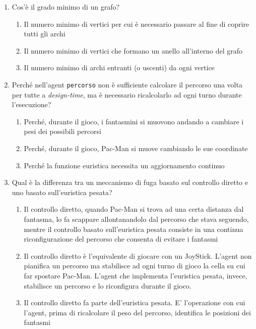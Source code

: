 \documentclass[8pt]{book}
\begin{document}
\begin{enumerate}
\item Cos'è il grado minimo di un grafo?

\begin{enumerate}
\def\labelenumi{\alph{enumi}.}
\item
  Il numero minimo di vertici per cui è necessario passare al fine di coprire tutti gli archi
\item
  Il numero minimo di vertici che formano un anello all'interno del grafo
\item
  Il numero minimo di archi entranti (o uscenti) da ogni vertice
\end{enumerate}

\item Perché nell'agent \texttt{percorso} non è sufficiente calcolare il percorso una volta per tutte a \emph{design-time}, ma è necessario ricalcolarlo ad ogni turno durante l'esecuzione?

\begin{enumerate}
\def\labelenumi{\alph{enumi}.}
\item
  Perché, durante il gioco, i fantasmini si muovono andando a cambiare i pesi dei possibili percorsi
\item
  Perché, durante il gioco, Pac-Man si muove cambiando le sue coordinate
\item
  Perché la funzione euristica necessita un aggiornamento continuo
\end{enumerate}

\item Qual è la differenza tra un meccanismo di fuga basato sul controllo diretto e uno basato sull'euristica pesata?

\begin{enumerate}
\def\labelenumi{\alph{enumi}.}
\item
  Il controllo diretto, quando Pac-Man si trova ad una certa distanza dal fantasma, lo fa scappare allontanandolo dal percorso che stava seguendo, mentre il controllo basato sull'euristica pesata consiste in una continua riconfigurazione del percorso che consenta di evitare i fantasmi
\item
  Il controllo diretto è l'equivalente di giocare con un JoyStick. L'agent non pianifica un percorso ma stabilisce ad ogni turno di gioco la cella su cui far spostare Pac-Man. L'agent che implementa l'euristica pesata, invece, stabilisce un percorso e lo riconfigura durante il gioco.
\item
  Il controllo diretto fa parte dell'euristica pesata. E' l'operazione con cui l'agent, prima di ricalcolare il peso del percorso, identifica le posizioni dei fantasmi
\end{enumerate}


\end{enumerate}
\end{document}
